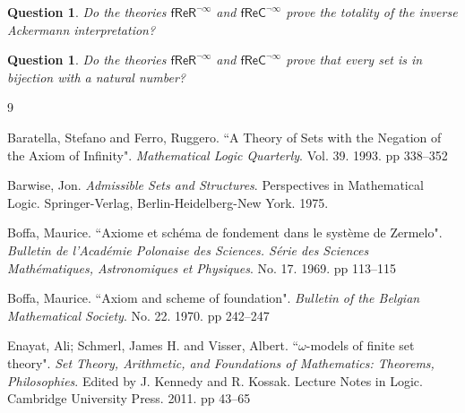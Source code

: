 \documentclass[11pt, a4paper]{article}
\newcounter{Theor1}
\newtheorem{question}[theorem]{Question}
\begin{document}
\begin{question}
Do the theories $\mathsf{fReR}^{\neg \infty}$ and $\mathsf{fReC}^{\neg \infty}$ prove the totality of the inverse Ackermann interpretation?
\end{question}

\begin{question}
Do the theories $\mathsf{fReR}^{\neg \infty}$ and $\mathsf{fReC}^{\neg \infty}$ prove that every set is in bijection with a natural number?
\end{question} 

\begin{thebibliography}{9}

 Baratella, Stefano and Ferro, Ruggero. ``A Theory of Sets with the Negation of the Axiom of Infinity". {\it Mathematical Logic Quarterly}. Vol. 39. 1993. pp 338--352

 Barwise, Jon. {\it Admissible Sets and Structures}. Perspectives in Mathematical Logic. Springer-Verlag, Berlin-Heidelberg-New York. 1975.

 Boffa, Maurice. ``Axiome et sch\'{e}ma de fondement dans le syst\`{e}me de Zermelo". {\it Bulletin de l'Acad\'{e}mie Polonaise des Sciences. S\'{e}rie des Sciences Math\'{e}matiques, Astronomiques et Physiques}. No. 17. 1969. pp 113--115

 Boffa, Maurice. ``Axiom and scheme of foundation". {\it Bulletin of the Belgian Mathematical Society}. No. 22. 1970. pp 242--247

 Enayat, Ali; Schmerl, James H. and Visser, Albert. ``$\omega$-models of finite set theory". {\it Set Theory, Arithmetic, and Foundations of Mathematics: Theorems, Philosophies}. Edited by J. Kennedy and R. Kossak. Lecture Notes in Logic. Cambridge University Press. 2011. pp 43--65






\end{thebibliography}
\end{document}
